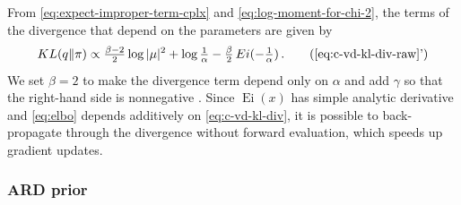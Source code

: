 \documentclass[a4paper,10pt,onecolumn]{article}
\newcommand{\cplx}{\mathbb{C}}
\begin{document}
From \eqref{eq:expect-improper-term-cplx} and \eqref{eq:log-moment-for-chi-2}, the terms of
the divergence that depend on the parameters are given by
\begin{equation}  \label{eq:c-vd-kl-div}
  KL(q\| \pi)
    \propto
      \tfrac{\beta-2}2 \log{\lvert \mu \rvert^2}
      + \log{\tfrac1{\alpha}}
      - \tfrac{\beta}2 \mathop{Ei}(- \tfrac1{\alpha})
      \,.
      \tag{\ref{eq:c-vd-kl-div-raw}'}
\end{equation}
We set $\beta = 2$ to make the divergence term depend only on $\alpha$ and add $\gamma$
so that the right-hand side is nonnegative \citep[eq.(84)]{lapidoth_capacity_2003}.
%
Since $\mathop{Ei}(x)$ has simple analytic derivative and \eqref{eq:elbo} depends additively
on \eqref{eq:c-vd-kl-div}, it is possible to back-propagate through the divergence without
forward evaluation, which speeds up gradient updates.


\subsubsection{ARD prior} %
\label{ssub:ard_prior}
\end{document}
